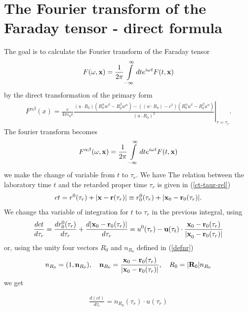 \section{The Fourier transform of the Faraday tensor - direct formula}\label{sect:FTF-direct}
The goal is to calculate the Fourier transform of the Faraday tensor
\begin{align}
  F(\omega, {\bf x}) = \frac1{2\pi}\int\limits_{-\infty}^{\infty} dt e^{i\omega t}F(t,{\bf x})
\end{align}
by the direct transformation of the primary form
\begin{align}
  F^{\alpha\beta}(x)
  =\left.\frac{e}{4\pi\epsilon_0c}
  \frac{(u\cdot R_0)(R_0^{\alpha}w^{\beta}-R_0^{\beta}w^{\alpha})
  -((w\cdot R_0)-c^2)(R_0^{\alpha}u^{\beta}-R_0^{\beta}u^{\alpha})}
  {(u\cdot R_0)^3}\right|_{\tau=\tau_r}.\label{eq:F_alpha_beta_primary_form-used1}
\end{align}
The fourier transform becomes
\begin{align}
  F^{\alpha\beta}(\omega, {\bf x})=\frac1{2\pi}\int\limits_{-\infty}^{\infty}dte^{i\omega t}F(t,{\bf x})
\end{align}
we make the change of variable from $t$ to $\tau_r$. We have
The relation between the laboratory time $t$ and the retarded proper time $\tau_r$ is given in (\ref{ct-taur-rel})
\begin{align}
  ct= r^0(\tau_r)+|{\bf x}-{\bf r}(\tau_r)| \equiv r_0^0(\tau_r)+|{\bf x}_0-{\bf r}_0(\tau_r)|.
\end{align}
We change tha variable of integration for $t$ to $\tau_r$ in the previous integral, using
\begin{align}
  \frac{d{ct}}{d\tau_r} = \frac{dr_0^0(\tau_r)}{d\tau_r} + \frac{d|{\bf x}_0 -{\bf r}_0(\tau_r)|}{d\tau_r} = u^0(\tau_r) - {\bf u}(\tau_t)\cdot\frac{{\bf x}_0 -{\bf r}_0(\tau_r)}{{|\bf x}_0 -{\bf r}_0(\tau_r)|}
\end{align}
or, using the unity four vectors $R_0$ and   $n_{R_0}$ defined in (\ref{defnr})
\begin{align}
  n_{R_0}=(1,{\bf n}_{R_0}),\quad {\bf n}_{R_0}=\frac{{\bf x}_0-{\bf r}_0(\tau_r)}{|{\bf x}_0-{\bf r}_0(\tau_r)|},\quad  R_0 =  |{\bf R}_0|n_{R_0}
\end{align}
we get
\begin{importantbox}
  \begin{align}
    \frac{d(ct)}{d\tau_r} = {n_{R_0}(\tau_r)\cdot u(\tau_r)}
  \end{align}
\end{importantbox}
